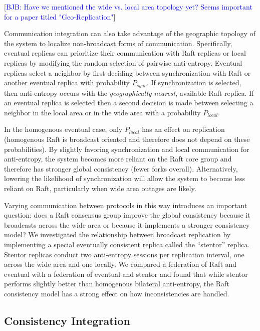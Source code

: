 \documentclass[10pt,conference,letterpaper]{IEEEtran}
\newcommand{\blue}[1]{{\textcolor{blue}{#1}}}
\newcommand{\bjb}[1]{[\blue{BJB: #1}]}
\begin{document}
\bjb{Have we mentioned the wide vs. local area topology yet? Seems important for a paper titled "Geo-Replication"}

Communication integration can also take advantage of the geographic topology of the
system to localize non-broadcast forms of communication.
Specifically, eventual replicas can prioritize their communication with Raft replicas or
local replicas by modifying the random selection of pairwise anti-entropy.
Eventual replicas select a neighbor by first deciding between synchronization with Raft
or another eventual replica with probability $P_{sync}$.
If synchronization is selected, then anti-entropy occurs with the \textit{geographically
nearest}, available Raft replica.
If an eventual replica is selected then a second decision is made between selecting a
neighbor in the local area or in the wide area with a probability $P_{local}$.

In the homogenous eventual case, only $P_{local}$ has an effect on replication
(homogenous Raft is broadcast oriented and therefore does not depend on these
probabilities).
By slightly favoring synchronization and local communication for anti-entropy, the
system becomes more reliant on the Raft core group and therefore has stronger global
consistency (fewer forks overall).
Alternatively, lowering the likelihood of synchronization will allow the system to become
less reliant on Raft, particularly when wide area outages are likely.

Varying communication between protocols in this way introduces an important question:
does a Raft consensus group improve the global consistency because it broadcasts across
the wide area or because it implements a stronger consistency model?
We investigated the relationship between broadcast replication by implementing a special
eventually consistent replica called the ``stentor'' replica.
Stentor replicas conduct two anti-entropy sessions per replication interval, one across the wide area and one locally.
We compared a federation of Raft and eventual with a federation of eventual and stentor
and found that while stentor performs slightly better than homogenous bilateral anti-entropy, the Raft consistency model has a strong effect on how inconsistencies are
handled.

\subsection{Consistency Integration}
\end{document}
